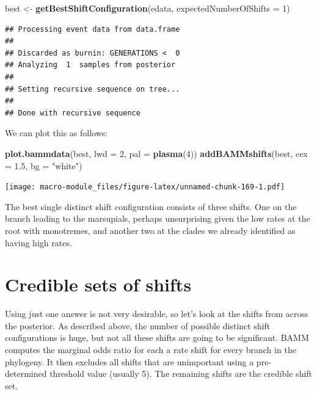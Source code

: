 \documentclass[]{book}
\newenvironment{Shaded}{\begin{snugshade}}{\end{snugshade}}
\newcommand{\KeywordTok}[1]{\textcolor[rgb]{0.13,0.29,0.53}{\textbf{{#1}}}}
\newcommand{\DataTypeTok}[1]{\textcolor[rgb]{0.13,0.29,0.53}{{#1}}}
\newcommand{\DecValTok}[1]{\textcolor[rgb]{0.00,0.00,0.81}{{#1}}}
\newcommand{\FloatTok}[1]{\textcolor[rgb]{0.00,0.00,0.81}{{#1}}}
\newcommand{\StringTok}[1]{\textcolor[rgb]{0.31,0.60,0.02}{{#1}}}
\newcommand{\NormalTok}[1]{{#1}}
\begin{document}
\begin{Shaded}
\begin{Highlighting}[]
\NormalTok{best <-}\StringTok{ }\KeywordTok{getBestShiftConfiguration}\NormalTok{(edata, }\DataTypeTok{expectedNumberOfShifts =} \DecValTok{1}\NormalTok{)}
\end{Highlighting}
\end{Shaded}

\begin{verbatim}
## Processing event data from data.frame
## 
## Discarded as burnin: GENERATIONS <  0
## Analyzing  1  samples from posterior
## 
## Setting recursive sequence on tree...
## 
## Done with recursive sequence
\end{verbatim}

We can plot this as follows:

\begin{Shaded}
\begin{Highlighting}[]
\KeywordTok{plot.bammdata}\NormalTok{(best, }\DataTypeTok{lwd =} \DecValTok{2}\NormalTok{, }\DataTypeTok{pal =} \KeywordTok{plasma}\NormalTok{(}\DecValTok{4}\NormalTok{))}
\KeywordTok{addBAMMshifts}\NormalTok{(best, }\DataTypeTok{cex =} \FloatTok{1.5}\NormalTok{, }\DataTypeTok{bg =} \StringTok{"white"}\NormalTok{)}
\end{Highlighting}
\end{Shaded}

\texttt{[image: macro-module\_files/figure-latex/unnamed-chunk-169-1.pdf]}

The best single distinct shift configuration consists of three shifts.
One on the branch leading to the marsupials, perhaps unsurprising given
the low rates at the root with monotremes, and another two at the clades
we already identified as having high rates.

\section{Credible sets of shifts}\label{credible-sets-of-shifts}

Using just one answer is not very desirable, so let's look at the shifts
from across the posterior. As described above, the number of possible
distinct shift configurations is huge, but not all these shifts are
going to be significant. BAMM computes the marginal odds ratio for each
a rate shift for every branch in the phylogeny. It then excludes all
shifts that are unimportant using a pre-determined threshold value
(usually 5). The remaining shifts are the credible shift set.
\end{document}

